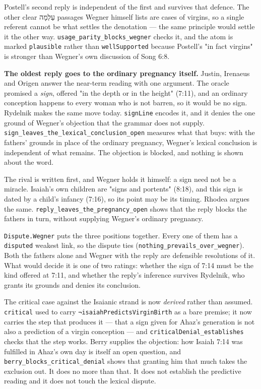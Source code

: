 \documentclass[11pt]{article}
\begin{document}
Postell's second reply is independent of the first and survives that defence. The other clear עַלְמָה passages Wegner himself lists are cases of virgins, so a single referent cannot be what settles the denotation — the same principle would settle it the other way. \texttt{usage\_\allowbreak{}parity\_\allowbreak{}blocks\_\allowbreak{}wegner} checks it, and the atom is marked \texttt{plausible} rather than \texttt{well\allowbreak{}Supported} because Postell's "in fact virgins" is stronger than Wegner's own discussion of Song 6:8.

\textbf{The oldest reply goes to the ordinary pregnancy itself.} Justin, Irenaeus and Origen answer the near-term reading with one argument. The oracle promised a \emph{sign}, offered "in the depth or in the height" (7:11), and an ordinary conception happens to every woman who is not barren, so it would be no sign. Rydelnik makes the same move today. \texttt{sign\allowbreak{}Line} encodes it, and it denies the one ground of Wegner's objection that the grammar does not supply. \texttt{sign\_\allowbreak{}leaves\_\allowbreak{}the\_\allowbreak{}lexical\_\allowbreak{}conclusion\_\allowbreak{}open} measures what that buys: with the fathers' grounds in place of the ordinary pregnancy, Wegner's lexical conclusion is independent of what remains. The objection is blocked, and nothing is shown about the word.

The rival is written first, and Wegner holds it himself: a sign need not be a miracle. Isaiah's own children are "signs and portents" (8:18), and this sign is dated by a child's infancy (7:16), so its point may be its timing. Rhodea argues the same. \texttt{reply\_\allowbreak{}leaves\_\allowbreak{}the\_\allowbreak{}pregnancy\_\allowbreak{}open} shows that the reply blocks the fathers in turn, without supplying Wegner's ordinary pregnancy.

\texttt{Dispute.Wegner} puts the three positions together. Every one of them has a \texttt{disputed} weakest link, so the dispute ties (\texttt{nothing\_\allowbreak{}prevails\_\allowbreak{}over\_\allowbreak{}wegner}). Both the fathers alone and Wegner with the reply are defensible resolutions of it. What would decide it is one of two ratings: whether the sign of 7:14 must be the kind offered at 7:11, and whether the reply's inference survives Rydelnik, who grants its grounds and denies its conclusion.

The critical case against the Isaianic strand is now \emph{derived} rather than assumed. \texttt{critical} used to carry \texttt{¬isaiah\allowbreak{}Predicts\allowbreak{}Virgin\allowbreak{}Birth} as a bare premise; it now carries the step that produces it — that a sign given for Ahaz's generation is not also a prediction of a virgin conception — and \texttt{critical\allowbreak{}Denial\_\allowbreak{}establishes} checks that the step works. Berry supplies the objection: how Isaiah 7:14 was fulfilled in Ahaz's own day is itself an open question, and \texttt{berry\_\allowbreak{}blocks\_\allowbreak{}critical\_\allowbreak{}denial} shows that granting him that much takes the exclusion out. It does no more than that. It does not establish the predictive reading and it does not touch the lexical dispute.
\end{document}
